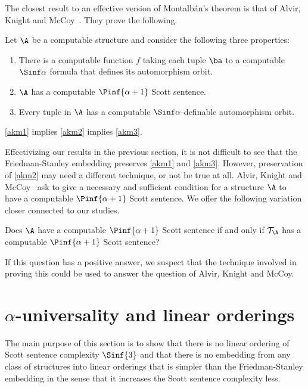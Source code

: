 \documentclass{amsart}
\newcommand{\T}{{\mathcal{T}}}
\begin{document}
The closest result to an effective version of Montalb\'an's theorem is that of Alvir, Knight and McCoy~\cite{alvir2020a}. They prove the following.

\begin{theorem}\label{thm:alvirknightmccoy}
   Let $\A$ be a computable structure and consider the following three properties:
\begin{enumerate}
   \item\label{akm1} There is a computable function $f$ taking each tuple $\ba$ to a
     computable $\Sinf\alpha$ formula that defines its automorphism orbit.
  \item\label{akm2} $\A$ has a computable $\Pinf{\alpha+1}$ Scott sentence.
  \item\label{akm3} Every tuple in $\A$ has a computable $\Sinf\alpha$-definable automorphism orbit.
\end{enumerate}
\cref{akm1} implies \cref{akm2} implies \cref{akm3}.
\end{theorem}

Effectivizing our results in the previous section, it is not difficult to see
that the Friedman-Stanley embedding preserves \cref{akm1} and \cref{akm3}. 
However, preservation of \cref{akm2} may need a different technique, or not be true at all.
Alvir, Knight and McCoy~\cite{alvir2020a} ask to give a necessary and sufficient
condition for a structure $\A$ to have a computable $\Pinf{\alpha+1}$ Scott sentence.
We offer the following variation closer connected to our studies.

\begin{question}
Does $\A$ have a computable $\Pinf{\alpha+1}$ Scott sentence if and only if
$\T_\A$ has a computable $\Pinf{\alpha+1}$ Scott sentence?
\end{question}

If this question has a positive answer, we suspect that the technique involved
in proving this could be used to answer the question of Alvir, Knight and McCoy.
 \section{$\alpha$-universality and linear orderings}\label{sec:universality}
The main purpose of this section is to show that there is no linear ordering of
Scott sentence complexity $\Sinf{3}$ and that there is no embedding from any
class of structures into linear orderings that is simpler than the
Friedman-Stanley embedding in the sense that it increases the Scott sentence
complexity less.
\end{document}
